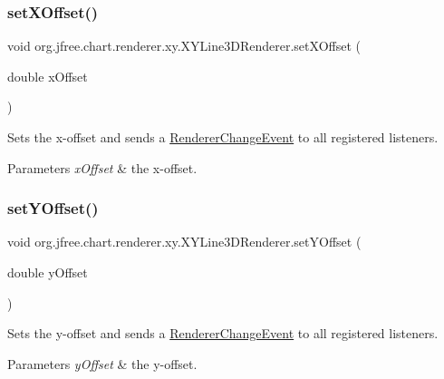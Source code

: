 \subsubsection{\texorpdfstring{set\+X\+Offset()}{setXOffset()}}
{\footnotesize\ttfamily void org.\+jfree.\+chart.\+renderer.\+xy.\+X\+Y\+Line3\+D\+Renderer.\+set\+X\+Offset (\begin{DoxyParamCaption}\item[{double}]{x\+Offset }\end{DoxyParamCaption})}

Sets the x-\/offset and sends a \mbox{\hyperlink{}{Renderer\+Change\+Event}} to all registered listeners.


\begin{DoxyParams}{Parameters}
{\em x\+Offset} & the x-\/offset. \\
\hline
\end{DoxyParams}
\mbox{\label{classorg_1_1jfree_1_1chart_1_1renderer_1_1xy_1_1_x_y_line3_d_renderer_a4ebd6f3becf2252afa54fc72d13ccedc}} 
\subsubsection{\texorpdfstring{set\+Y\+Offset()}{setYOffset()}}
{\footnotesize\ttfamily void org.\+jfree.\+chart.\+renderer.\+xy.\+X\+Y\+Line3\+D\+Renderer.\+set\+Y\+Offset (\begin{DoxyParamCaption}\item[{double}]{y\+Offset }\end{DoxyParamCaption})}

Sets the y-\/offset and sends a \mbox{\hyperlink{}{Renderer\+Change\+Event}} to all registered listeners.


\begin{DoxyParams}{Parameters}
{\em y\+Offset} & the y-\/offset. \\
\hline
\end{DoxyParams}


